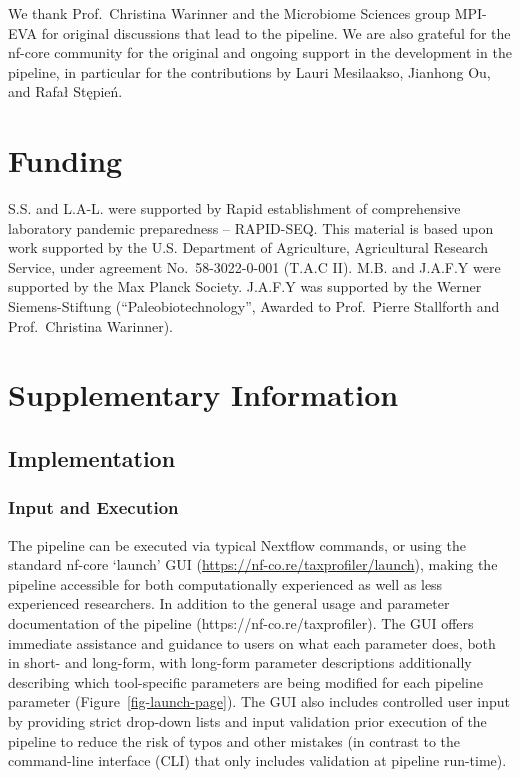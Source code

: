 \documentclass[
]{article}
\begin{document}
We thank Prof.~Christina Warinner and the Microbiome Sciences group
MPI-EVA for original discussions that lead to the pipeline. We are also
grateful for the nf-core community for the original and ongoing support
in the development in the pipeline, in particular for the contributions
by Lauri Mesilaakso, Jianhong Ou, and Rafał Stępień.

\hypertarget{funding}{%
\section{Funding}\label{funding}}

S.S. and L.A-L. were supported by Rapid establishment of comprehensive
laboratory pandemic preparedness -- RAPID-SEQ. This material is based
upon work supported by the U.S. Department of Agriculture, Agricultural
Research Service, under agreement No.~58-3022-0-001 (T.A.C II). M.B. and
J.A.F.Y were supported by the Max Planck Society. J.A.F.Y was supported
by the Werner Siemens-Stiftung (``Paleobiotechnology'', Awarded to
Prof.~Pierre Stallforth and Prof.~Christina Warinner).

\hypertarget{supplementary-information}{%
\section{Supplementary Information}\label{supplementary-information}}

\hypertarget{implementation}{%
\subsection{Implementation}\label{implementation}}

\hypertarget{input-and-execution}{%
\subsubsection{Input and Execution}\label{input-and-execution}}

The pipeline can be executed via typical Nextflow commands, or using the
standard nf-core `launch' GUI
(\url{https://nf-co.re/taxprofiler/launch}), making the pipeline
accessible for both computationally experienced as well as less
experienced researchers. In addition to the general usage and parameter
documentation of the pipeline (https://nf-co.re/taxprofiler). The GUI
offers immediate assistance and guidance to users on what each parameter
does, both in short- and long-form, with long-form parameter
descriptions additionally describing which tool-specific parameters are
being modified for each pipeline parameter
(Figure~\ref{fig-launch-page}). The GUI also includes controlled user
input by providing strict drop-down lists and input validation prior
execution of the pipeline to reduce the risk of typos and other mistakes
(in contrast to the command-line interface (CLI) that only includes
validation at pipeline run-time).
\end{document}
